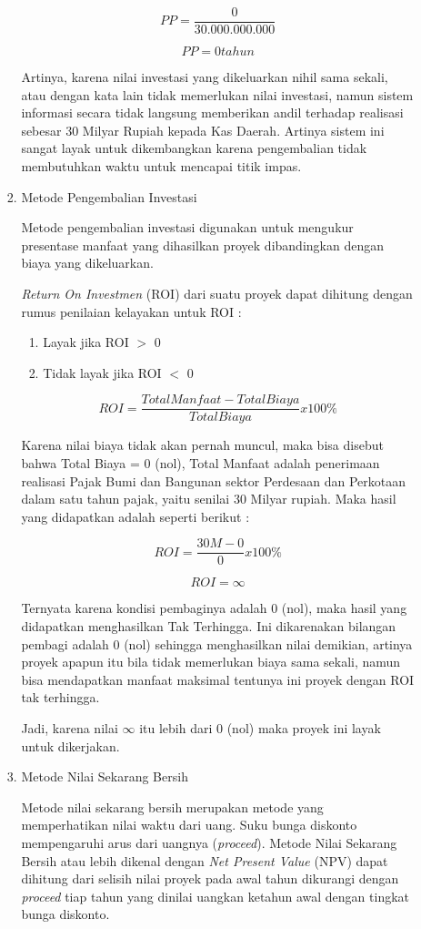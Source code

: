 \documentclass[pdftex,12pt, oneside]{article}
\begin{document}
\begin{enumerate}
\begin{enumerate}
\begin{enumerate}
\[ PP = \frac{0}{30.000.000.000} \]

\[ PP = 0 tahun \]

Artinya, karena nilai investasi yang dikeluarkan nihil sama sekali, atau dengan kata lain tidak memerlukan nilai investasi, namun sistem informasi secara tidak langsung memberikan andil terhadap realisasi sebesar 30 Milyar Rupiah kepada Kas Daerah. Artinya sistem ini sangat layak untuk dikembangkan karena pengembalian tidak membutuhkan waktu untuk mencapai titik impas.
	
	\item Metode Pengembalian Investasi
	
Metode pengembalian investasi digunakan untuk mengukur presentase manfaat yang dihasilkan proyek dibandingkan dengan biaya yang dikeluarkan.

\textit{Return On Investmen} (ROI) dari suatu proyek dapat dihitung dengan rumus penilaian kelayakan untuk ROI :

\begin{enumerate}
	\item Layak jika ROI $>$ 0
	\item Tidak layak jika ROI $<$ 0
\end{enumerate}	

\[ ROI = \frac{Total Manfaat - Total Biaya}{Total Biaya} x 100\% \]
	
Karena nilai biaya tidak akan pernah muncul, maka bisa disebut bahwa Total Biaya = 0 (nol), Total Manfaat adalah penerimaan realisasi Pajak Bumi dan Bangunan sektor Perdesaan dan Perkotaan dalam satu tahun pajak, yaitu senilai 30 Milyar rupiah. Maka hasil yang didapatkan adalah seperti berikut :

\[ ROI = \frac{30 M - 0}{0} x 100\% \]

\[ ROI = \infty \]

Ternyata karena kondisi pembaginya adalah 0 (nol), maka hasil yang didapatkan menghasilkan Tak Terhingga. Ini dikarenakan bilangan pembagi adalah 0 (nol) sehingga menghasilkan nilai demikian, artinya proyek apapun itu bila tidak memerlukan biaya sama sekali, namun bisa mendapatkan manfaat maksimal tentunya ini proyek dengan ROI tak terhingga.

Jadi, karena nilai $ \infty $ itu lebih dari 0 (nol) maka proyek ini layak untuk dikerjakan.
	
	\item Metode Nilai Sekarang Bersih
	
Metode nilai sekarang bersih merupakan metode yang memperhatikan nilai waktu dari uang. Suku bunga diskonto mempengaruhi arus dari uangnya (\textit{proceed}). Metode Nilai Sekarang Bersih atau lebih dikenal dengan \textit{Net Present Value} (NPV) dapat dihitung dari selisih nilai proyek pada awal tahun dikurangi dengan \textit{proceed} tiap tahun yang dinilai uangkan ketahun awal dengan tingkat bunga diskonto.


\end{enumerate}
\end{enumerate}
\end{enumerate}
\end{document}
